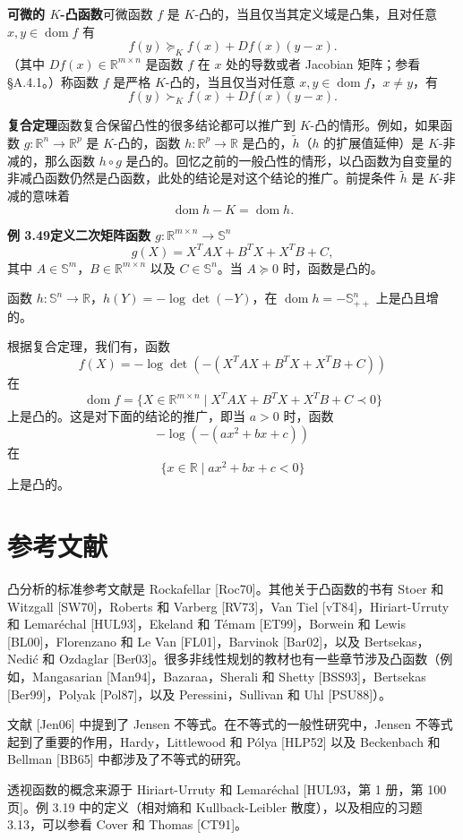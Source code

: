 \documentclass[UTF8, 12pt, fontset=fandol, oneside]{ctexart}
\DeclareMathOperator{\dom}{dom}
\begin{document}
\noindent\textbf{可微的 $K$-凸函数}\quad 可微函数 $f$ 是 $K$-凸的，当且仅当其定义域是凸集，且对任意 $x,y\in\dom f$ 有
\[
f(y)\succeq_K f(x)+Df(x)(y-x).
\]
（其中 $Df(x)\in\mathbb{R}^{m\times n}$ 是函数 $f$ 在 $x$ 处的导数或者 Jacobian 矩阵；参看 \S A.4.1。）称函数 $f$ 是严格 $K$-凸的，当且仅当对任意 $x,y\in\dom f$，$x\neq y$，有
\[
f(y)\succ_K f(x)+Df(x)(y-x).
\]

\noindent\textbf{复合定理}\quad 函数复合保留凸性的很多结论都可以推广到 $K$-凸的情形。例如，如果函数 $g:\mathbb{R}^n\to\mathbb{R}^p$ 是 $K$-凸的，函数 $h:\mathbb{R}^p\to\mathbb{R}$ 是凸的，$\tilde h$（$h$ 的扩展值延伸）是 $K$-非减的，那么函数 $h\circ g$ 是凸的。回忆之前的一般凸性的情形，以凸函数为自变量的非减凸函数仍然是凸函数，此处的结论是对这个结论的推广。前提条件 $\tilde h$ 是 $K$-非减的意味着
\[
\dom h-K=\dom h.
\]

\noindent\textbf{例 3.49\quad 定义二次矩阵函数 $g:\mathbb{R}^{m\times n}\to\mathbb{S}^n$}
\[
g(X)=X^TAX+B^TX+X^TB+C,
\]
其中 $A\in\mathbb{S}^m$，$B\in\mathbb{R}^{m\times n}$ 以及 $C\in\mathbb{S}^n$。当 $A\succeq0$ 时，函数是凸的。

函数 $h:\mathbb{S}^n\to\mathbb{R}$，$h(Y)=-\log\det(-Y)$，在 $\dom h=-\mathbb{S}_{++}^n$ 上是凸且增的。

根据复合定理，我们有，函数
\[
f(X)=-\log\det(-(X^TAX+B^TX+X^TB+C))
\]
在
\[
\dom f=\{X\in\mathbb{R}^{m\times n}\mid X^TAX+B^TX+X^TB+C\prec0\}
\]
上是凸的。这是对下面的结论的推广，即当 $a>0$ 时，函数
\[
-\log(-(ax^2+bx+c))
\]
在
\[
\{x\in\mathbb{R}\mid ax^2+bx+c<0\}
\]
上是凸的。

\section*{参考文献}

凸分析的标准参考文献是 Rockafellar [Roc70]。其他关于凸函数的书有 Stoer 和 Witzgall [SW70]，Roberts 和 Varberg [RV73]，Van Tiel [vT84]，Hiriart-Urruty 和 Lemaréchal [HUL93]，Ekeland 和 Témam [ET99]，Borwein 和 Lewis [BL00]，Florenzano 和 Le Van [FL01]，Barvinok [Bar02]，以及 Bertsekas，Nedić 和 Ozdaglar [Ber03]。很多非线性规划的教材也有一些章节涉及凸函数（例如，Mangasarian [Man94]，Bazaraa，Sherali 和 Shetty [BSS93]，Bertsekas [Ber99]，Polyak [Pol87]，以及 Peressini，Sullivan 和 Uhl [PSU88]）。

文献 [Jen06] 中提到了 Jensen 不等式。在不等式的一般性研究中，Jensen 不等式起到了重要的作用，Hardy，Littlewood 和 Pólya [HLP52] 以及 Beckenbach 和 Bellman [BB65] 中都涉及了不等式的研究。

透视函数的概念来源于 Hiriart-Urruty 和 Lemaréchal [HUL93，第 1 册，第 100 页]。例 3.19 中的定义（相对熵和 Kullback-Leibler 散度），以及相应的习题 3.13，可以参看 Cover 和 Thomas [CT91]。
\end{document}
